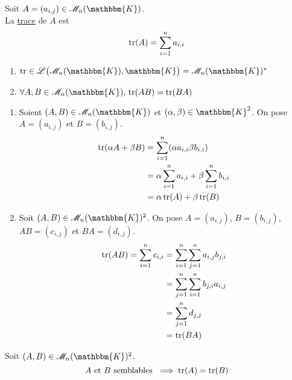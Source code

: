 \begin{defn}
	Soit $A = (a_{i,j}) \in \mathcal{M}_n(\mathbbm{K})$.\\
	La \underline{trace} de $A$ est \[
		\operatorname{tr}(A) = \sum_{i=1}^n a_{i,i}
	\]
\end{defn}

\begin{prop}
	\begin{enumerate}
		\item $\tr \in \mathcal{L}\big(\mathcal{M}_n(\mathbbm{K}), \mathbbm{K}\big) = \mathcal{M}_n(\mathbbm{K})^*$
		\item $\forall A,B \in \mathcal{M}_n(\mathbbm{K}),\, \tr(AB) = \tr(BA)$
	\end{enumerate}
\end{prop}

\begin{prv}
	\begin{enumerate}
		\item Soient $(A,B) \in \mathcal{M}_n(\mathbbm{K})$ et $(\alpha, \beta) \in \mathbbm{K}^2$. On pose $A = (a_{i,j})$ et $B = (b_{i,j})$.
			\begin{align*}
				\operatorname{tr}(\alpha A + \beta B) &= \sum_{i=1}^n (\alpha a_{i,i} \beta b_{i,i}) \\
				&= \alpha \sum_{i=1}^n a_{i,i} + \beta \sum_{i=1}^n b_{i,i} \\
				&= \alpha \operatorname{tr}(A) + \beta \operatorname{tr}(B) \\
			\end{align*}
		\item Soit $(A,B) \in \mathcal{M}_n(\mathbbm{K})^2$. On pose $A = (a_{i,j})$, $B = (b_{i,j})$, $AB = (c_{i,j})$ et $BA = (d_{i,j})$.
			\begin{align*}
				\operatorname{tr}(AB) = \sum_{i=1}^n c_{i,i} &= \sum_{i=1}^n \sum_{j=1}^n a_{i,j} b_{j,i} \\
				&= \sum_{j=1}^n \sum_{i=1}^n b_{j,i}a_{i,j} \\
				&= \sum_{j=1}^n d_{j,j} \\
				&= \operatorname{tr}(BA) \\
			\end{align*}
	\end{enumerate}
\end{prv}

\begin{prop}
	Soit $(A,B) \in \mathcal{M}_n(\mathbbm{K})^2$. \[
		A \text{ et } B \text{ semblables } \implies \operatorname{tr}(A) = \operatorname{tr}(B)
	\]
\end{prop}

